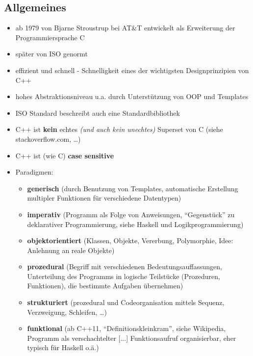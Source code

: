 \documentclass[a4paper]{report}
\begin{document}
\subsection{Allgemeines}
\begin{itemize}
\item ab 1979 von Bjarne Stroustrup bei AT\&T entwickelt als Erweiterung der Programmiersprache C
\item später von ISO genormt
\vspace{2ex}
\item effizient und schnell - Schnelligkeit eines der wichtigsten Designprinzipien von C++
\item hohes Abstraktionsniveau u.a. durch Unterstützung von OOP und Templates
\item ISO Standard beschreibt auch eine Standardbibliothek
\item C++ ist \textbf{kein} echtes \textit{(und auch kein unechtes)} Superset von C (siehe stackoverflow.com, \dots)
\item C++ ist (wie C) \textbf{case sensitive}
\vspace{2ex}

\item Paradigmen:
	\begin{itemize}
		\item \textbf{generisch} (durch Benutzung von Templates, automatische Erstellung multipler Funktionen für verschiedene Datentypen)
		\item \textbf{imperativ} (Programm als Folge von Anweisungen, "`Gegenstück"' zu deklarativer Programmierung, siehe Haskell und Logikprogrammierung)
		\item \textbf{objektorientiert} (Klassen, Objekte, Vererbung, Polymorphie, Idee: Anlehnung an reale Objekte)
		\item \textbf{prozedural} (Begriff mit verschiedenen Bedeutungsauffassungen, Unterteilung des Programms in logische Teilstücke (Prozeduren, Funktionen), die bestimmte Aufgaben übernehmen)
		\item \textbf{strukturiert} (prozedural und Codeorganisation mittels Sequenz, Verzweigung, Schleifen, \dots )
		\item \textbf{funktional} (ab C++11, "`Definitionskleinkram"', siehe Wikipedia, Programm als verschachtelter [...] Funktionsaufruf organisierbar, eher typisch für Haskell o.ä.)
	\end{itemize}
\end{itemize}
\end{document}
